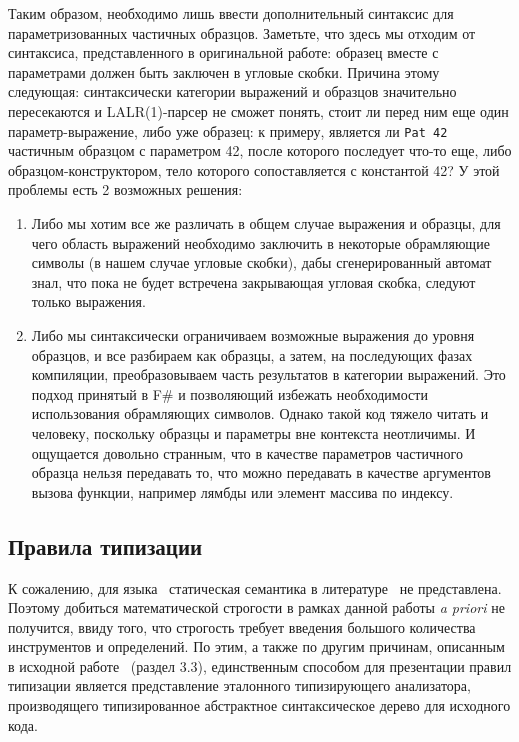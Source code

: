 Таким образом, необходимо лишь ввести дополнительный синтаксис для параметризованных частичных образцов. Заметьте, что здесь мы отходим от синтаксиса, представленного в оригинальной работе: образец вместе с параметрами должен быть заключен в угловые скобки. Причина этому следующая: синтаксически категории выражений и образцов значительно пересекаются и LALR(1)-парсер не сможет понять, стоит ли перед ним еще один параметр-выражение, либо уже образец: к примеру, является ли \lstinline|Pat 42| частичным образцом с параметром 42, после которого последует что-то еще, либо образцом-конструктором, тело которого сопоставляется с константой 42? У этой проблемы есть 2 возможных решения:

\begin{enumerate}
\item Либо мы хотим все же различать в общем случае выражения и образцы, для чего область выражений необходимо заключить в некоторые обрамляющие символы (в нашем случае угловые скобки), дабы сгенерированный автомат знал, что пока не будет встречена закрывающая угловая скобка, следуют только выражения.
\item Либо мы синтаксически ограничиваем возможные выражения до уровня образцов, и все разбираем как образцы, а затем, на последующих фазах компиляции, преобразовываем часть результатов в категории выражений. Это подход принятый в F\# и позволяющий избежать необходимости использования обрамляющих символов. Однако такой код тяжело читать и человеку, поскольку образцы и параметры вне контекста неотличимы. И ощущается довольно странным, что в качестве параметров частичного образца нельзя передавать то, что можно передавать в качестве аргументов вызова функции, например лямбды или элемент массива по индексу.
\end{enumerate}

\subsection{Правила типизации}

К сожалению, для языка \ocaml~статическая семантика в литературе~\cite{syme2007extensible} не представлена. Поэтому добиться математической строгости в рамках данной работы \emph{a priori} не получится, ввиду того, что строгость требует введения большого количества инструментов и определений. По этим, а также по другим причинам, описанным в исходной работе~\cite{syme2007extensible} (раздел 3.3), единственным способом для презентации правил типизации является представление эталонного типизирующего анализатора, производящего типизированное абстрактное синтаксическое дерево для исходного кода. 

